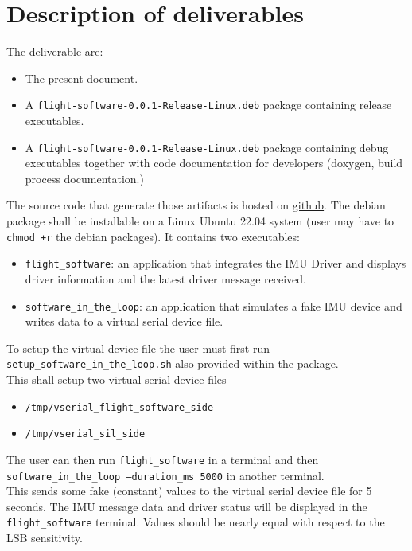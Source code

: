\section{Description of deliverables}
The deliverable are:
\begin{itemize}
    \item The present document.
    \item A \texttt{flight-software-0.0.1-Release-Linux.deb} package containing release executables.
    \item A \texttt{flight-software-0.0.1-Release-Linux.deb} package containing debug executables together with code documentation for developers (doxygen, build process documentation.)
\end{itemize}

The source code that generate those artifacts is hosted on \href{https://github.com/renn0xtek9/assignment}{github}.
The debian package shall be installable on a Linux Ubuntu 22.04 system (user may have to \texttt{chmod +r} the debian packages).
It contains two executables:
\begin{itemize}
    \item \texttt{flight\_software}: an application that integrates the IMU Driver and displays driver information and the latest driver message received.
    \item \texttt{software\_in\_the\_loop}: an application that simulates a fake IMU device and writes data to a virtual serial device file.
\end{itemize}
To setup the virtual device file the user must first run \texttt{setup\_software\_in\_the\_loop.sh} also provided within the package.\\
This shall setup two virtual serial device files
\begin{itemize}
    \item \texttt{/tmp/vserial\_flight\_software\_side}
    \item \texttt{/tmp/vserial\_sil\_side}
\end{itemize}
The user can then run \newline \texttt{flight\_software} \newline in a terminal and then \newline \texttt{software\_in\_the\_loop --duration\_ms 5000} \newline in another terminal. \\
This sends some fake (constant) values to the virtual serial device file for 5 seconds.
The IMU message data and driver status will be displayed in the \texttt{flight\_software} terminal. Values should be nearly equal with respect to the LSB sensitivity.

